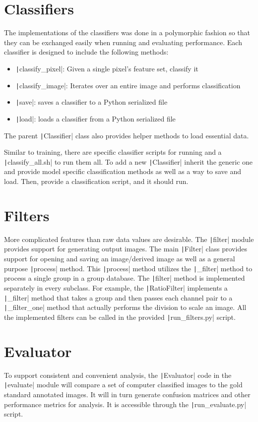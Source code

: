 \documentclass[twoside]{report}
\newcommand{\code}[1]{\texttt|#1|}
\begin{document}
\section{Classifiers}
The implementations of the classifiers was done in a polymorphic fashion so that they can be exchanged easily when running and evaluating performance. Each classifier is designed to include the following methods:
\begin{itemize}
\item \code{classify_pixel}: Given a single pixel's feature set, classify it 
\item \code{classify_image}: Iterates over an entire image and performs classification
\item \code{save}: saves a classifier to a Python serialized file
\item \code{load}: loads a classifier from a Python serialized file
\end{itemize}
The parent \code{Classifier} class also provides helper methods to load essential data. 

Similar to training, there are specific classifier scripts for running and a \code{classify_all.sh} to run them all. To add a new \code{Classifier} inherit the generic one and provide model specific classification methods as well as a way to save and load. Then, provide a classification script, and it should run. 

\section{Filters}
More complicated features than raw data values are desirable. The \code{filter} module provides support for generating output images. The main \code{Filter} class provides support for opening and saving an image/derived image as well as a general purpose \code{process} method. This \code{process} method utilizes the \code{_filter} method to process a single group in a group database. The \code{filter} method is implemented separately in every subclass. For example, the \code{RatioFilter} implements a \code{_filter} method that takes a group and then passes each channel pair to a \code{_filter_one} method that actually performs the division to scale an image. All the implemented filters can be called in the provided \code{run_filters.py} script. 

\section{Evaluator}
To support consistent and convenient analysis, the \code{Evaluator} code in the \code{evaluate} module will compare a set of computer classified images to the gold standard annotated images. It will in turn generate confusion matrices and other performance metrics for analysis. It is accessible through the \code{run_evaluate.py} script. 
\end{document}
